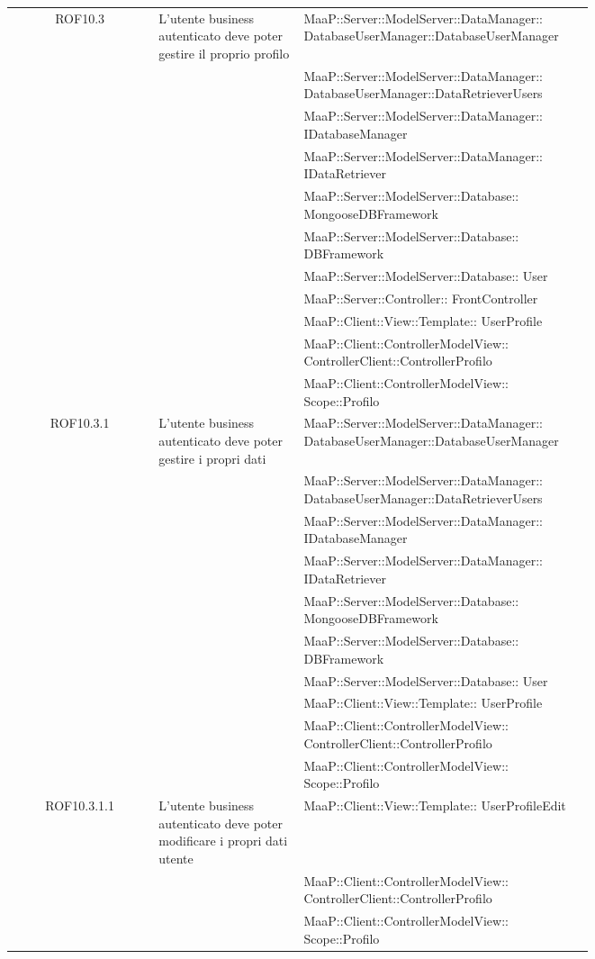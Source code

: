 \begin{center}
\begin{longtable}{|c|p{0.25\linewidth}|p{0.5\linewidth}|}
\midrule
ROF10.3
& L'utente business autenticato deve poter gestire il proprio profilo
& MaaP::Server::ModelServer::DataManager:: DatabaseUserManager::DatabaseUserManager\\
& & MaaP::Server::ModelServer::DataManager:: DatabaseUserManager::DataRetrieverUsers\\
& & MaaP::Server::ModelServer::DataManager:: IDatabaseManager\\
& & MaaP::Server::ModelServer::DataManager:: IDataRetriever\\
& & MaaP::Server::ModelServer::Database:: MongooseDBFramework\\
& & MaaP::Server::ModelServer::Database:: DBFramework\\
& & MaaP::Server::ModelServer::Database:: User\\
& & MaaP::Server::Controller:: FrontController\\
& & MaaP::Client::View::Template:: UserProfile\\
& & MaaP::Client::ControllerModelView:: ControllerClient::ControllerProfilo\\
& & MaaP::Client::ControllerModelView:: Scope::Profilo\\

\midrule
ROF10.3.1
& L'utente business autenticato deve poter gestire i propri dati
& MaaP::Server::ModelServer::DataManager:: DatabaseUserManager::DatabaseUserManager\\
& & MaaP::Server::ModelServer::DataManager:: DatabaseUserManager::DataRetrieverUsers\\
& & MaaP::Server::ModelServer::DataManager:: IDatabaseManager\\
& & MaaP::Server::ModelServer::DataManager:: IDataRetriever\\
& & MaaP::Server::ModelServer::Database:: MongooseDBFramework\\
& & MaaP::Server::ModelServer::Database:: DBFramework\\
& & MaaP::Server::ModelServer::Database:: User\\
& & MaaP::Client::View::Template:: UserProfile\\
& & MaaP::Client::ControllerModelView:: ControllerClient::ControllerProfilo\\
& & MaaP::Client::ControllerModelView:: Scope::Profilo\\

\midrule
ROF10.3.1.1
& L'utente business autenticato deve poter modificare i propri dati utente
& MaaP::Client::View::Template:: UserProfileEdit\\
& & MaaP::Client::ControllerModelView:: ControllerClient::ControllerProfilo\\
& & MaaP::Client::ControllerModelView:: Scope::Profilo\\


\end{longtable}
\end{center}
